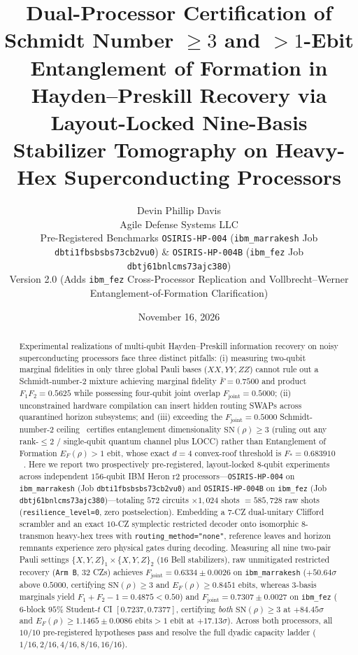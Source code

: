 \documentclass[11pt,twocolumn]{article}
\title{\textbf{Dual-Processor Certification of Schmidt Number $\ge 3$ and $>1$-Ebit Entanglement of Formation in Hayden--Preskill Recovery via Layout-Locked Nine-Basis Stabilizer Tomography on Heavy-Hex Superconducting Processors}}
\author{Devin Phillip Davis\\
\small Agile Defense Systems LLC\\
\small Pre-Registered Benchmarks \texttt{OSIRIS-HP-004} (\texttt{ibm\_marrakesh} Job \texttt{dbti1fbsbsbs73cb2vu0}) \& \texttt{OSIRIS-HP-004B} (\texttt{ibm\_fez} Job \texttt{dbtj61bnlcms73ajc380})\\
\small Version 2.0 (Adds \texttt{ibm\_fez} Cross-Processor Replication and Vollbrecht--Werner Entanglement-of-Formation Clarification)}
\date{November 16, 2026}
\begin{document}
\maketitle

\begin{abstract}
Experimental realizations of multi-qubit Hayden--Preskill information recovery on noisy superconducting processors face three distinct pitfalls: (i) measuring two-qubit marginal fidelities in only three global Pauli bases ($XX, YY, ZZ$) cannot rule out a Schmidt-number-$2$ mixture achieving marginal fidelity $\bar{F}=0.7500$ and product $F_1 F_2 = 0.5625$ while possessing four-qubit joint overlap $F_{\mathrm{joint}}=0.5000$; (ii) unconstrained hardware compilation can insert hidden routing SWAPs across quarantined horizon subsystems; and (iii) exceeding the $F_{\mathrm{joint}}=0.5000$ Schmidt-number-$2$ ceiling~\cite{TerhalHorodecki2000} certifies entanglement dimensionality $\mathrm{SN}(\rho)\ge 3$ (ruling out any rank-$\le 2$ / single-qubit quantum channel plus LOCC) rather than Entanglement of Formation $E_F(\rho)>1\text{ ebit}$, whose exact $d=4$ convex-roof threshold is $F_* = 0.683910$~\cite{VollbrechtWerner2001}. Here we report two prospectively pre-registered, layout-locked $8$-qubit experiments across independent $156$-qubit IBM Heron r2 processors---\texttt{OSIRIS-HP-004} on \texttt{ibm\_marrakesh} (Job \texttt{dbti1fbsbsbs73cb2vu0}) and \texttt{OSIRIS-HP-004B} on \texttt{ibm\_fez} (Job \texttt{dbtj61bnlcms73ajc380})---totaling $572$ circuits $\times 1{,}024$ shots $= 585{,}728$ raw shots (\texttt{resilience\_level=0}, zero postselection). Embedding a $7$-CZ dual-unitary Clifford scrambler and an exact $10$-CZ symplectic restricted decoder onto isomorphic $8$-transmon heavy-hex trees with \texttt{routing\_method="none"}, reference leaves and horizon remnants experience zero physical gates during decoding. Measuring all nine two-pair Pauli settings $\{X,Y,Z\}_1\times\{X,Y,Z\}_2$ ($16$ Bell stabilizers), raw unmitigated restricted recovery (\texttt{Arm B}, $32$ CZs) achieves $F_{\mathrm{joint}}=0.6334 \pm 0.0026$ on \texttt{ibm\_marrakesh} ($+50.64\sigma$ above $0.5000$, certifying $\mathrm{SN}(\rho)\ge 3$ and $E_F(\rho)\ge 0.8451\text{ ebits}$, whereas $3$-basis marginals yield $F_1+F_2-1=0.4875<0.50$) and $F_{\mathrm{joint}}=0.7307 \pm 0.0027$ on \texttt{ibm\_fez} ($6$-block $95\%$ Student-$t$ CI $[0.7237, 0.7377]$, certifying \emph{both} $\mathrm{SN}(\rho)\ge 3$ at $+84.45\sigma$ and $E_F(\rho)\ge 1.1465 \pm 0.0086\text{ ebits} > 1\text{ ebit}$ at $+17.13\sigma$). Across both processors, all $10/10$ pre-registered hypotheses pass and resolve the full dyadic capacity ladder ($1/16, 2/16, 4/16, 8/16, 16/16$).
\end{abstract}
\end{document}

